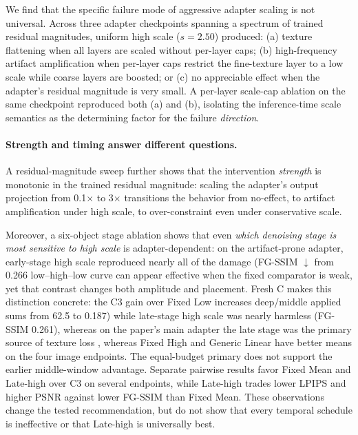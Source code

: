 \documentclass[times,twocolumn,final]{elsarticle}
\providecommand{\DIFadd}[1]{{\protect\color{blue} \sf #1}} %
\providecommand{\DIFdel}[1]{{\protect\color{red} \scriptsize #1}} %
\providecommand{\DIFaddbegin}{} %
\providecommand{\DIFaddend}{} %
\providecommand{\DIFdelbegin}{} %
\providecommand{\DIFdelend}{} %
\begin{document}
\DIFdel{We find that the specific failure mode of aggressive adapter scaling is not universal. Across three adapter checkpoints spanning a spectrum of trained residual magnitudes, uniform high scale ($s = 2.50$) produced: (a) texture flattening when all layers are scaled without per-layer caps; (b) high-frequency artifact amplification when per-layer caps restrict the fine-texture layer to a low scale while coarse layers are boosted; or (c) no appreciable effect when the adapter's residual magnitude is very small. A per-layer scale-cap ablation on the same checkpoint reproduced both (a) and (b), isolating the inference-time scale semantics as the determining factor for the failure \emph{direction}. }%

\DIFdelend \DIFaddbegin \paragraph{Strength and timing answer different questions.}
\DIFaddend A \DIFdelbegin \DIFdel{residual-magnitude sweep further shows that the intervention \emph{strength} is monotonic in the trained residual magnitude: scaling the adapter's output projection from 0.1$\times$ to 3$\times$ transitions the behavior from no-effect, to artifact amplification under high scale, to over-constraint even under conservative scale.
}%

\DIFdel{Moreover, a six-object stage ablation shows that even \emph{which denoising stage is most sensitive to high scale} is adapter-dependent: on the artifact-prone adapter, early-stage high scale reproduced nearly all of the damage (FG-SSIM $\downarrow$ from 0.266 }\DIFdelend \DIFaddbegin \DIFadd{low--high--low curve can appear effective when the fixed comparator is weak, yet that contrast changes both amplitude and placement. Fresh C makes this distinction concrete: the C3 gain over Fixed Low increases deep/middle applied sums from 62.5 }\DIFaddend to \DIFdelbegin \DIFdel{0.187) while late-stage high scale was nearly harmless (FG-SSIM 0.261), whereas on the paper's main adapter the late stage was the primary source of texture loss}\DIFdelend \DIFaddbegin \DIFadd{82.5, whereas Fixed High and Generic Linear have better means on the four image endpoints. The equal-budget primary does not support the earlier middle-window advantage. Separate pairwise results favor Fixed Mean and Late-high over C3 on several endpoints, while Late-high trades lower LPIPS and higher PSNR against lower FG-SSIM than Fixed Mean. These observations change the tested recommendation, but do not show that every temporal schedule is ineffective or that Late-high is universally best}\DIFaddend .
\end{document}
